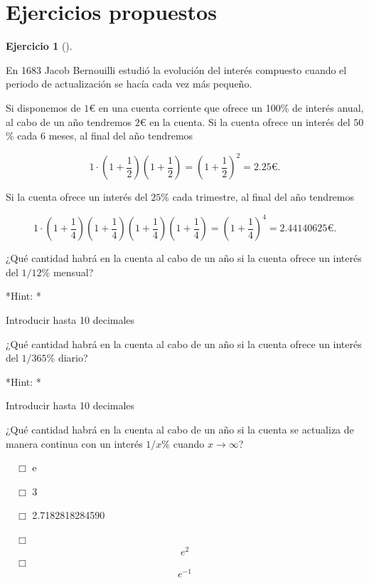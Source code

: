 \documentclass[
  a4paper,
]{scrreport}
\theoremstyle{definition}
\newtheorem{exercise}{Ejercicio}[chapter]
\theoremstyle{remark}
\begin{document}
\section{Ejercicios propuestos}\label{ejercicios-propuestos-2}

\begin{exercise}[]\protect\hypertarget{exr-interes-compuesto}{}\label{exr-interes-compuesto}

En 1683 Jacob Bernouilli estudió la evolución del interés compuesto
cuando el periodo de actualización se hacía cada vez más pequeño.

Si disponemos de \(1\)€ en una cuenta corriente que ofrece un 100\% de
interés anual, al cabo de un año tendremos \(2\)€ en la cuenta. Si la
cuenta ofrece un interés del \(50\)\% cada 6 meses, al final del año
tendremos

\[
1\cdot\left(1+\frac{1}{2}\right)\left(1+\frac{1}{2}\right)= \left(1+\frac{1}{2}\right)^2 = 2.25\mbox{€}.
\]

Si la cuenta ofrece un interés del \(25\)\% cada trimestre, al final del
año tendremos

\[
1\cdot\left(1+\frac{1}{4}\right)\left(1+\frac{1}{4}\right)\left(1+\frac{1}{4}\right)\left(1+\frac{1}{4}\right)= \left(1+\frac{1}{4}\right)^4 = 2.44140625\mbox{€}.
\]

¿Qué cantidad habrá en la cuenta al cabo de un año si la cuenta ofrece
un interés del \(1/12\)\% mensual?

\vspace{18pt}*Hint: *

Introducir hasta 10 decimales

¿Qué cantidad habrá en la cuenta al cabo de un año si la cuenta ofrece
un interés del \(1/365\)\% diario?

\vspace{18pt}*Hint: *

Introducir hasta 10 decimales

¿Qué cantidad habrá en la cuenta al cabo de un año si la cuenta se
actualiza de manera continua con un interés \(1/x\)\% cuando
\(x\to\infty\)?

${\quad\Box}$ e

${\quad\Box}$ 3

${\quad\Box}$ 2.7182818284590

${\quad\Box}$ $$e^2$$
${\quad\Box}$ $$e^{-1}$$

\end{exercise}
\end{document}
